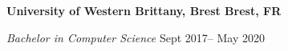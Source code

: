 \textbf{University of Western Brittany, Brest \hfill Brest, FR} \par
\textit{Bachelor in Computer Science} \hfill Sept 2017-- May 2020\par
